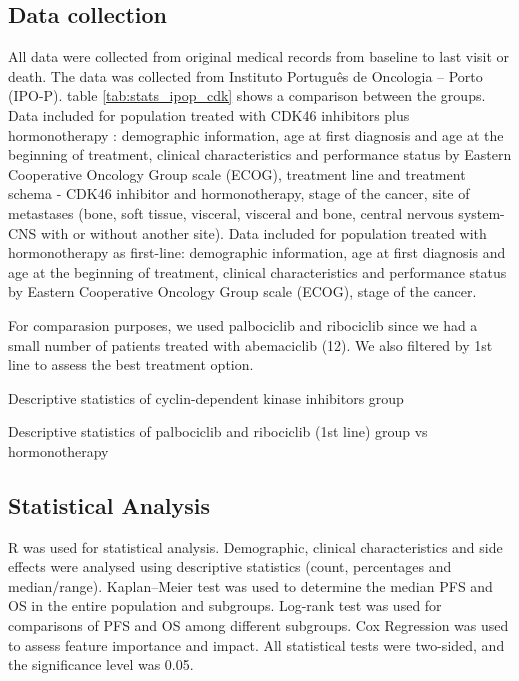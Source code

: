 \subsection{Data collection}
All data were collected from original medical records from baseline to last visit or death.
The data was collected from  Instituto Português de Oncologia – Porto (IPO-P).  table \ref{tab:stats_ipop_cdk} shows a comparison between the groups.
Data included for population treated with CDK4\/6 inhibitors plus hormonotherapy : demographic information, age at first diagnosis and age at the beginning of treatment, clinical characteristics and performance status by Eastern Cooperative Oncology Group scale (ECOG), treatment line and treatment schema -  CDK4\/6 inhibitor and hormonotherapy, stage of the cancer, site of metastases (bone, soft tissue, visceral, visceral and bone, central nervous system-CNS with or without another site).
Data included for population treated with hormonotherapy as first-line: demographic information, age at first diagnosis and age at the beginning of treatment, clinical characteristics and performance status by Eastern Cooperative Oncology Group scale (ECOG),  stage of the cancer.

For comparasion purposes, we used palbociclib and ribociclib since we had a small number of patients treated with abemaciclib (12). We also filtered by 1st line to assess the best treatment option.

 
\begin{table}
\caption{Descriptive statistics of cyclin-dependent kinase inhibitors group}
\centering
\label{tab:stats_ipop_cdk}

\end{table}


\begin{table}[]
\caption{Descriptive statistics of palbociclib and ribociclib (1st line) group vs hormonotherapy}
\centering

\label{tab:stats_ipop_control}

\end{table}

\subsection{Statistical Analysis}
R was used for statistical analysis. Demographic, clinical characteristics and side effects were analysed using descriptive statistics (count, percentages and median/range). Kaplan–Meier test was used to determine the median PFS and OS in the entire population and subgroups. Log-rank test was used for comparisons of PFS and OS among different subgroups. Cox Regression was used to assess feature importance and impact. All statistical tests were two-sided, and the significance level was 0.05. 




